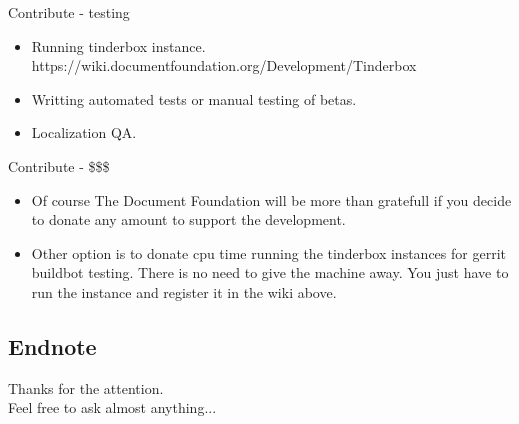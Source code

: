 \documentclass{beamer}
\begin{document}
\begin{frame}{Contribute - testing}
	\begin{itemize}
	\item Running tinderbox instance. https://wiki.documentfoundation.org/Development/Tinderbox
	\item Writting automated tests or manual testing of betas.
	\item Localization QA.
	\end{itemize}
\end{frame}

\begin{frame}{Contribute - \$\$\$}
	\begin{itemize}
	\item Of course The Document Foundation will be more than gratefull if you decide to donate any amount to support the development. \\
	\item Other option is to donate cpu time running the tinderbox instances for gerrit buildbot testing. There is no need to give the machine away.
	You just have to run the instance and register it in the wiki above.
	\end{itemize}
\end{frame}

\subsection{Endnote}
\begin{frame}{}
        \begin{center}
		Thanks for the attention.\\
		Feel free to ask almost anything...
	\end{center}
\end{frame}
\end{document}
